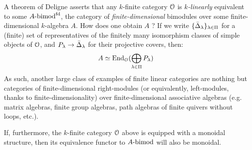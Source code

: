             \begin{remark} \label{remark: deligne_theorem_on_finite_linear_categories}
                A theorem of Deligne asserts that any $k$-finite category $\mathcal{O}$ is \textit{$k$-linearly} equivalent to some $A\text{-}\mathrm{bimod}^{\mathrm{fd}}$, the category of \textit{finite-dimensional} bimodules over some finite-dimensional $k$-algebra $A$. How does one obtain $A$ ? If we write $\{\bar{\Delta}_{\lambda}\}_{\lambda \in \Pi}$ for a (finite) set of representatives of the finitely many isomorphism classes of simple objects of $\mathcal{O}$, and $P_{\lambda} \to \bar{\Delta}_{\lambda}$ for their projective covers, then:
                    $$A \simeq \mathrm{End}_{\mathcal{O}}( \bigoplus_{\lambda \in \Pi} P_{\lambda} )$$
                As such, another large class of examples of finite linear categories are nothing but categories of finite-dimensional right-modules (or equivalently, left-modules, thanks to finite-dimensionality) over finite-dimensional associative algebras (e.g. matrix algebras, finite group algebras, path algebras of finite quivers without loops, etc.).  

                If, furthermore, the $k$-finite category $\mathcal{O}$ above is equipped with a monoidal structure, then its equivalence functor to $A\text{-}\mathrm{bimod}$ will also be monoidal. 
            \end{remark}

